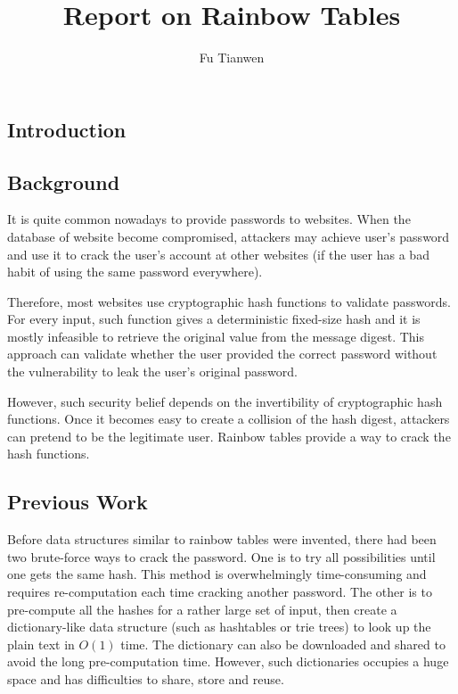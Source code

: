 \documentclass{article}
\title{Report on Rainbow Tables}
\author{Fu Tianwen}
\begin{document}
\maketitle
\begin{multicols}{2}
\section{Introduction}
\subsection{Background}
It is quite common nowadays to provide passwords to websites. When the database of website become compromised, attackers may achieve user's password and use it to crack the user's account at other websites (if the user has a bad habit of using the same password everywhere).

Therefore, most websites use cryptographic hash functions to validate passwords. For every input, such function gives a deterministic fixed-size hash and it is mostly infeasible to retrieve the original value from the message digest\cite{wiki:cryptoHash}. This approach can validate whether the user provided the correct password without the vulnerability to leak the user's original password.

However, such security belief depends on the invertibility of cryptographic hash functions. Once it becomes easy to create a collision of the hash digest, attackers can pretend to be the legitimate user. Rainbow tables provide a way to crack the hash functions.

\subsection{Previous Work}
Before data structures similar to rainbow tables were invented, there had been two brute-force ways to crack the password. One is to try all possibilities until one gets the same hash. This method is overwhelmingly time-consuming and requires re-computation each time cracking another password. The other is to pre-compute all the hashes for a rather large set of input, then create a dictionary-like data structure (such as hashtables or trie trees) to look up the plain text in $O(1)$ time. The dictionary can also be downloaded and shared to avoid the long pre-computation time. However, such dictionaries occupies a huge space and has difficulties to share, store and reuse.


\end{multicols}
\end{document}
